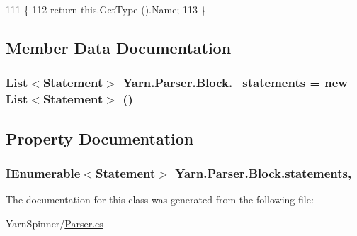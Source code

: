 \begin{DoxyCode}
111             \{
112                 \textcolor{keywordflow}{return} this.GetType ().Name;
113             \}
\end{DoxyCode}


\subsection{Member Data Documentation}
\hypertarget{a00022_ad79f9582e55ec75b68fd72ffcae0f41b}{
\subsubsection[{\-\_\-statements}]{\setlength{\rightskip}{0pt plus 5cm}List$<${\bf Statement}$>$ Yarn.\-Parser.\-Block.\-\_\-statements = new List$<${\bf Statement}$>$ ()\hspace{0.3cm}{\ttfamily [private]}}}\label{a00022_ad79f9582e55ec75b68fd72ffcae0f41b}


\subsection{Property Documentation}
\hypertarget{a00022_a42e3d555bbd5ecbdf61c45ad715be7e1}{
\subsubsection[{statements}]{\setlength{\rightskip}{0pt plus 5cm}I\-Enumerable$<${\bf Statement}$>$ Yarn.\-Parser.\-Block.\-statements\hspace{0.3cm}{\ttfamily [get]}, {\ttfamily [package]}}}\label{a00022_a42e3d555bbd5ecbdf61c45ad715be7e1}


The documentation for this class was generated from the following file\-:\begin{DoxyCompactItemize}
\item 
Yarn\-Spinner/\hyperlink{a00125}{Parser.\-cs}\end{DoxyCompactItemize}

